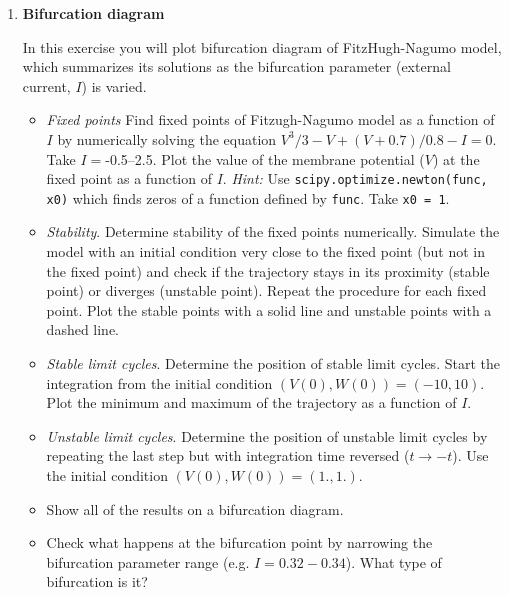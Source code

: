 \documentclass[12pt]{article}
\begin{document}
\begin{enumerate}
\begin{itemize}
       \end{itemize}
   \item \textbf{Bifurcation diagram}

       In this exercise you will plot bifurcation diagram of
       FitzHugh-Nagumo model, which summarizes its solutions as the
       bifurcation parameter (external current, $I$) is varied.
       \begin{itemize}
    \item \textit{Fixed points} Find fixed points of Fitzugh-Nagumo
        model as a function of $I$ by numerically
        solving the equation $V^3/3-V+(V+0.7)/0.8-I=0$. Take
        $I=$-0.5--2.5. Plot the value of the membrane potential ($V$)
        at the fixed point as a function of $I$.
        \textit{Hint:} Use \texttt{scipy.optimize.newton(func, x0)}
        which finds zeros of a function defined by \texttt{func}. Take
        \texttt{x0 = 1}.
    \item \textit{Stability}. Determine stability of the fixed points
        numerically. Simulate the model with an initial condition
        very close to the fixed point (but not in the fixed point) and
        check if the trajectory stays in its proximity (stable point)
        or diverges (unstable point). Repeat the procedure for each
        fixed point. Plot the stable points with a solid line and
        unstable points with a dashed line.
    \item \textit{Stable limit cycles}. Determine the position of
        stable limit cycles. Start the integration from the initial
        condition $(V(0), W(0))=(-10,10)$. Plot the minimum and
        maximum of the trajectory as a function of $I$.  
    
    \item \textit{Unstable limit cycles}. Determine the
        position of unstable limit cycles by repeating the last step
        but with integration time reversed ($t\rightarrow-t$). Use the
        initial condition $(V(0), W(0))=(1.,1.)$.
    
    \item Show all of the results on a bifurcation diagram.  

    \item Check what happens at the bifurcation point by narrowing the
        bifurcation parameter range (e.g. $I=0.32-0.34$). What
        type of bifurcation is it?
    \end{itemize}
\end{enumerate}
\end{document}
